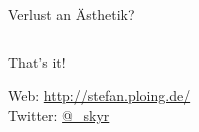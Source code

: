 \documentclass[hyperref={pdfpagelabels=false}]{beamer}
\begin{document}
\begin{frame}{Verlust an Ästhetik?}
	\begin{columns}
	\end{columns}
\end{frame}


\begin{frame}[plain]
	That's it!
	\begin{center}
	\end{center}
	\begin{center}
		Web: \url{http://stefan.ploing.de/} \\
		Twitter: \href{https://twitter.com/\_skyr}{@\_skyr}
	\end{center}
\end{frame}


\end{document}
